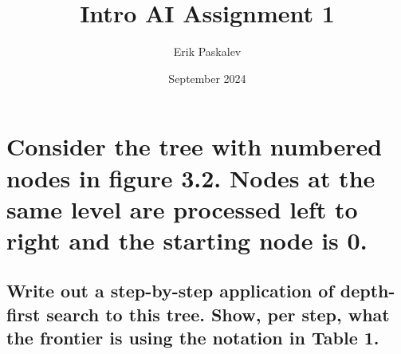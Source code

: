 \documentclass[11px]{article}
\title{Intro AI Assignment 1}
\author{Erik Paskalev }
\date{September 2024}
\begin{document}
\maketitle

\section{\normalfont Consider the tree with numbered nodes in figure 3.2. Nodes at the same level are processed left to right and the starting node is 0.}

\subsection{\normalfont Write out a step-by-step application of depth-first search to this tree. Show, per step, what the frontier is using the notation in Table 1.}
\end{document}
